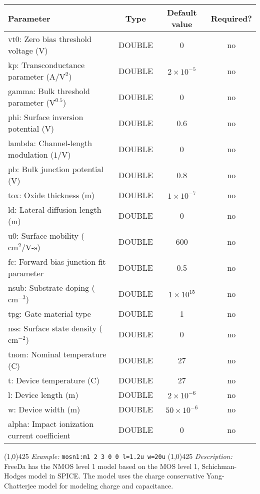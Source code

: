 \documentclass{article}
\newcommand{\FDA}{FreeDa}
\begin{document}
\begin{table}[tbph]
\begin{tabular}{|l|c|c|c|}
\hline
Parameter&Type&Default value&Required?\\
\hline
vt0: Zero bias threshold voltage (V)& DOUBLE & 0 & no\\
\hline
kp: Transconductance parameter ($\textrm{A}/\textrm{V}^2$) & DOUBLE & $2\times10^{-5}$ & no\\
\hline
gamma: Bulk threshold parameter ($\textrm{V}^{0.5}$) & DOUBLE & 0 & no\\
\hline
phi: Surface inversion potential (V) & DOUBLE & 0.6 & no\\
\hline
lambda: Channel-length modulation ($\textrm{1/V}$) & DOUBLE & 0 & no\\
\hline
pb: Bulk junction potential (V) & DOUBLE & 0.8 & no\\
\hline
tox: Oxide thickness (m)& DOUBLE & $1\times10^{-7}$ & no\\
\hline
ld: Lateral diffusion length (m) & DOUBLE & 0 & no\\
\hline
u0: Surface mobility ($\textrm{cm}^2/\textrm{V-s}$)& DOUBLE & 600 & no\\
\hline
fc: Forward bias junction fit parameter & DOUBLE &  0.5 & no\\
\hline
nsub: Substrate doping ($\textrm{cm}^{-3}$) & DOUBLE & $1\times10^{15}$ & no\\
\hline
tpg: Gate material type & DOUBLE & 1 & no\\
\hline
nss: Surface state density ($\textrm{cm}^{-2}$) & DOUBLE & 0 & no\\
\hline
tnom: Nominal temperature (C)& DOUBLE & 27 & no\\
\hline
t: Device temperature (C)& DOUBLE & 27 & no\\
\hline
l: Device length (m)& DOUBLE & $2\times10^{-6}$ & no\\
\hline
w: Device width (m)& DOUBLE & $50\times10^{-6}$ & no\\
\hline
alpha: Impact ionization current coefficient & DOUBLE & 0 & no\\
\hline

\end{tabular}
\end{table}

\linethickness{0.5mm} \line(1,0){425}
\newline
\textit{Example:}
\newline
\texttt{mosn1:m1\ 2\ 3\ 0\ 0\ l=1.2u w=20u}
\newline
\linethickness{0.5mm} \line(1,0){425}
\newline
\textit{Description:}\\
\FDA{} has the NMOS level 1 model based on the MOS level 1,
Schichman-Hodges model in SPICE. The model uses the charge
conservative Yang-Chatterjee model for modeling charge and capacitance. \\
\end{document}
